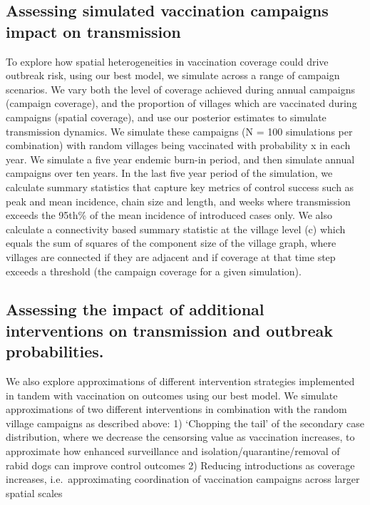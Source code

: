 \documentclass[
]{book}
\begin{document}
\hypertarget{assessing-simulated-vaccination-campaigns-impact-on-transmission}{%
\subsection{Assessing simulated vaccination campaigns impact on transmission}\label{assessing-simulated-vaccination-campaigns-impact-on-transmission}}

To explore how spatial heterogeneities in vaccination coverage could drive outbreak risk, using our best model, we simulate across a range of campaign scenarios. We vary both the level of coverage achieved during annual campaigns (campaign coverage), and the proportion of villages which are vaccinated during campaigns (spatial coverage), and use our posterior estimates to simulate transmission dynamics. We simulate these campaigns (N = 100 simulations per combination) with random villages being vaccinated with probability x in each year. We simulate a five year endemic burn-in period, and then simulate annual campaigns over ten years. In the last five year period of the simulation, we calculate summary statistics that capture key metrics of control success such as peak and mean incidence, chain size and length, and weeks where transmission exceeds the 95th\% of the mean incidence of introduced cases only. We also calculate a connectivity based summary statistic at the village level (c) which equals the sum of squares of the component size of the village graph, where villages are connected if they are adjacent and if coverage at that time step exceeds a threshold (the campaign coverage for a given simulation).

\hypertarget{assessing-the-impact-of-additional-interventions-on-transmission-and-outbreak-probabilities.}{%
\subsection{Assessing the impact of additional interventions on transmission and outbreak probabilities.}\label{assessing-the-impact-of-additional-interventions-on-transmission-and-outbreak-probabilities.}}

We also explore approximations of different intervention strategies implemented in tandem with vaccination on outcomes using our best model. We simulate approximations of two different interventions in combination with the random village campaigns as described above:
1) `Chopping the tail' of the secondary case distribution, where we decrease the censorsing value as vaccination increases, to approximate how enhanced surveillance and isolation/quarantine/removal of rabid dogs can improve control outcomes
2) Reducing introductions as coverage increases, i.e.~approximating coordination of vaccination campaigns across larger spatial scales
\end{document}
